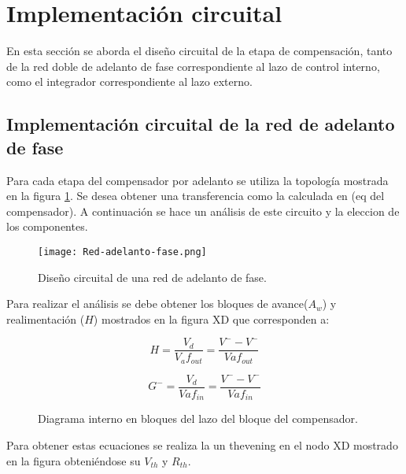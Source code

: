 \section{Implementación circuital}

En esta sección se aborda el diseño circuital de la etapa de compensación, tanto de la red doble de adelanto de fase correspondiente al lazo de control interno, como el integrador correspondiente al lazo externo.

\subsection{Implementación circuital de la red de adelanto de fase}

Para cada etapa del compensador por adelanto se utiliza la topología mostrada en la figura \ref{fig:red-adelanto-fase}. Se desea obtener una transferencia como la calculada en (eq del compensador). A continuación se hace un análisis de este circuito y la eleccion de los componentes. 

\begin{figure}[H]
	\centering
	\texttt{[image: Red-adelanto-fase.png]}
	\caption{Diseño circuital de una red de adelanto de fase.}
	\label{fig:red-adelanto-fase}
\end{figure}

Para realizar el análisis se debe obtener los bloques de avance($A_w$) y realimentación ($H$) mostrados en la figura XD que corresponden a:

\begin{equation} 
	H = \frac{V_d}{V_af_{out}}=\frac{V^- - V^-}{Vaf_{out}}
\end{equation}

\begin{equation} 
	G^- = \frac{V_d}{Vaf_{in}}=\frac{V^- - V^-}{Vaf_{in}}
\end{equation}

\begin{figure}[H]
	\centering
	
	\caption{Diagrama interno en bloques del lazo del bloque del compensador.}	
	\label{fig:diag-diagrama_lazo_compensador}
\end{figure}

Para obtener estas ecuaciones se realiza la un thevening en el nodo XD mostrado en la figura obteniéndose su $V_{th}$ y $R_{th}$.

